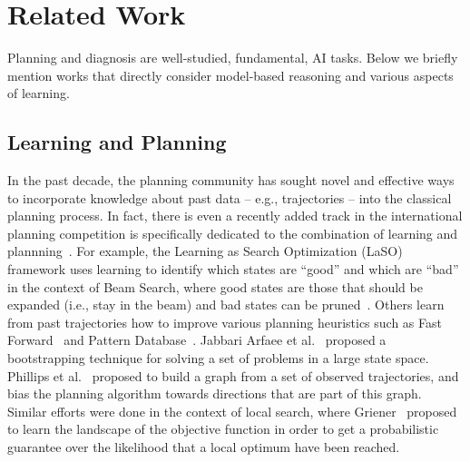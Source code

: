 \documentclass[12pt]{article}
\newcommand{\note}[1]{\textbf{\textit{#1}}}
\begin{document}
\section{Related Work}
Planning and diagnosis are well-studied, fundamental, AI tasks. 
Below we briefly mention works that directly consider model-based reasoning and various aspects of learning. 

\subsection{Learning and Planning}


In the past decade, the planning community has sought novel and effective ways to incorporate knowledge about past data -- e.g., trajectories -- into the classical planning process. 
In fact, there is even a recently added track in the international planning competition is specifically dedicated to the combination of learning and plannning~\cite{fern2011first}.  
For example, the Learning as Search Optimization (LaSO) framework uses learning to identify which states are ``good'' and which are ``bad''
in the context of Beam Search, where good states are those that should be expanded (i.e., stay in the beam) and bad states can be pruned~\cite{xu2007discriminative}. Others learn from past trajectories how to improve various planning heuristics such as Fast Forward~\cite{yoon2006learning} and Pattern Database~\cite{samadi2008learning}. Jabbari Arfaee et al.~\cite{arfaee2011learning} proposed a bootstrapping technique for solving a set of problems in a large state space. 
Phillips et al.~\cite{phillips2012graphs} proposed to build a graph from a set of observed trajectories, and bias the planning algorithm towards directions that are part of this graph. 
Similar efforts were done in the context of local search, 
where Griener~\cite{greiner1996palo} proposed to learn
the landscape of the objective function in order to get a probabilistic guarantee over the likelihood that a local optimum have been reached. 
\end{document}
